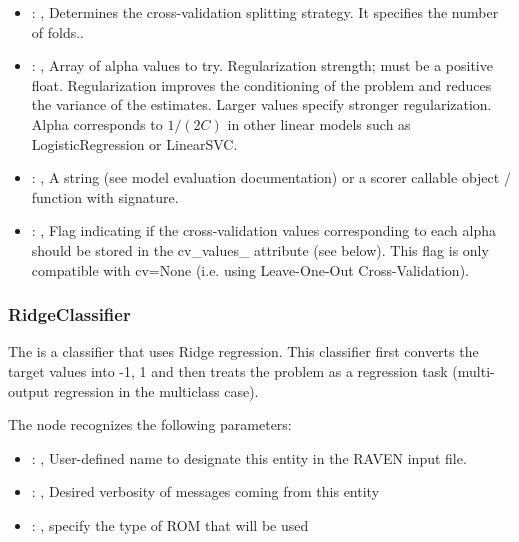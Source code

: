 \begin{itemize}
    \item {}: , 
      Determines the cross-validation splitting strategy.
      It specifies the number of folds..

    \item {}: , 
      Array of alpha values to try. Regularization strength; must be a positive float.
      Regularization                                                  improves the conditioning of
      the problem and reduces the variance of the estimates.
      Larger values specify stronger regularization. Alpha corresponds to $1 / (2C)$ in other
      linear models such as LogisticRegression or LinearSVC.

    \item {}: , 
      A string (see model evaluation documentation) or a scorer
      callable object / function with signature.

    \item {}: , 
      Flag indicating if the cross-validation values corresponding
      to each alpha should be stored in the cv\_values\_ attribute (see below).
      This flag is only compatible with cv=None (i.e. using Leave-One-Out
      Cross-Validation).
  \end{itemize}


\subsubsection{RidgeClassifier}
  The  is a classifier that uses Ridge regression.
  This classifier first converts the target values into {-1, 1} and then treats
  the problem as a regression task (multi-output regression in the multiclass case).

  The  node recognizes the following parameters:
    \begin{itemize}
      \item {}: , 
        User-defined name to designate this entity in the RAVEN input file.
      \item {}: , 
        Desired verbosity of messages coming from this entity
      \item {}: , 
        specify the type of ROM that will be used
  \end{itemize}

